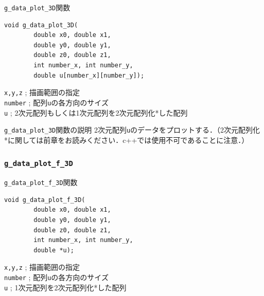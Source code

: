 \documentclass[platex,a4paper,12pt]{jsarticle}%
\begin{document}
\begin{itembox}[l]{\texttt{g\_data\_plot\_3D}関数}
\begin{verbatim}
void g_data_plot_3D(
        double x0, double x1,
        double y0, double y1,
        double z0, double z1,
        int number_x, int number_y,
        double u[number_x][number_y]);
\end{verbatim}
\verb|x,y,z| ; 描画範囲の指定\\
\verb|number| ; 配列\verb|u|の各方向のサイズ\\
\verb|u| ; 2次元配列もしくは1次元配列を2次元配列化*した配列
\end{itembox}

\begin{itembox}[l]{\texttt{g\_data\_plot\_3D}関数の説明}
2次元配列\verb|u|のデータをプロットする．（2次元配列化*に関しては前章をお読みください．c++では使用不可であることに注意．）
\end{itembox}

\begin{figure}[htb]
\end{figure}




\clearpage
\subsubsection{\texttt{g\_data\_plot\_f\_3D}}

\begin{itembox}[l]{\texttt{g\_data\_plot\_f\_3D}関数}
\begin{verbatim}
void g_data_plot_f_3D(
        double x0, double x1,
        double y0, double y1,
        double z0, double z1,
        int number_x, int number_y,
        double *u);
\end{verbatim}
\verb|x,y,z| ; 描画範囲の指定\\
\verb|number| ; 配列\verb|u|の各方向のサイズ\\
\verb|u| ; 1次元配列を2次元配列化*した配列
\end{itembox}
\end{document}
